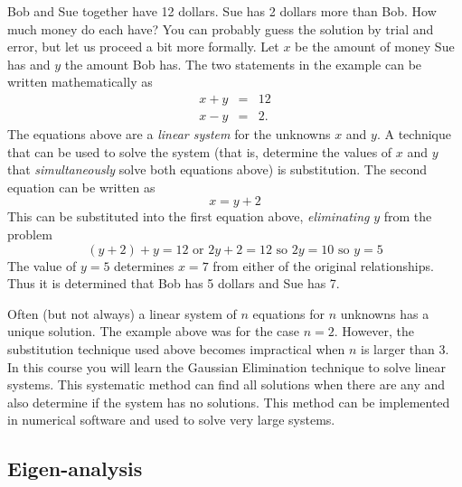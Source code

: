 \begin{example} Bob and Sue together have 12 dollars. Sue has
2 dollars more than Bob. How much money do each have? 
{\rm You can probably guess the solution by trial and error, but let us
proceed a bit more formally. Let $x$ be the amount of money Sue has
and $y$ the amount Bob has. The two statements in the example can be
written mathematically as
\begin{eqnarray*}
x + y & = & 12 \\
x - y & = & 2.
\end{eqnarray*}
The equations above are a {\em linear system} for the unknowns $x$ and
$y$. A technique that can be used to solve the system (that is,
determine the values of $x$ and $y$ that {\em simultaneously} solve
both equations above) is substitution. The second equation can be
written as
\[
x = y+2
\]
This can be substituted into the first equation above, {\em
eliminating} $y$ from the problem
\[
(y+2) + y = 12 \mbox{\   or $2y +2 = 12$ \ so $2y = 10$ \ so $y=5$}
\]
The value of $y=5$ determines $x=7$ from either of the original
relationships. Thus it is determined that Bob has 5 dollars and Sue
has 7. }
\end{example}

Often (but not always) a linear system of $n$ equations for $n$
unknowns has a unique solution. The example above was for the case
$n=2$. However, the substitution technique used above becomes
impractical when $n$ is larger than 3. In this course you will learn
the Gaussian Elimination technique to solve linear systems. This
systematic method can find all solutions when there are any and also
determine if the system has no solutions. This method can be
implemented in numerical software and used to solve very large
systems.

\subsection{Eigen-analysis} 


